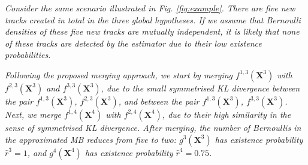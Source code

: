 \documentclass[journal]{IEEEtran}
\begin{document}
\begin{example}
\emph{Consider the same scenario illustrated in Fig. \ref{fig:example}. There are five new tracks created in total in the three global hypotheses. If we assume that Bernoulli densities of these five new tracks are mutually independent, it is likely that none of these tracks are detected by the estimator due to their low existence probabilities.} 

\emph{Following the proposed merging approach, we start by merging $f^{1,3}(\mathbf{X}^3)$ with $f^{2,3}(\mathbf{X}^3)$ and $f^{3,3}(\mathbf{X}^3)$, due to the small symmetrised KL divergence between the pair $f^{1,3}(\mathbf{X}^3)$, $f^{2,3}(\mathbf{X}^3)$, and between the pair $f^{1,3}(\mathbf{X}^3)$, $f^{3,3}(\mathbf{X}^3)$. Next, we merge $f^{1,4}(\mathbf{X}^4)$ with $f^{2,4}(\mathbf{X}^4)$, due to their high similarity in the sense of symmetrised KL divergence. After merging, the number of Bernoullis in the approximated MB reduces from five to two: $g^3(\mathbf{X}^3)$ has existence probability $\hat{r}^3=1$, and $g^4(\mathbf{X}^4)$ has existence probability $\hat{r}^4=0.75$.}
\\\IEEEQEDopen


\end{example}
\end{document}
